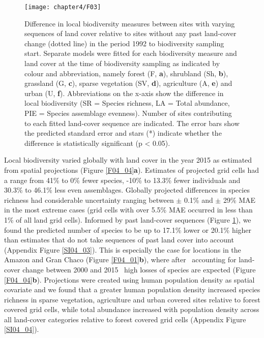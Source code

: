 \begin{figure}[ht]
\centering
\texttt{[image: chapter4/F03]}
\caption{ Difference in local biodiversity measures between sites with varying sequences of land cover relative to sites without any past land-cover change (dotted line) in the period 1992 to biodiversity sampling start. Separate models were fitted for each biodiversity measure and land cover at the time of biodiversity sampling as indicated by colour and abbreviation, namely forest (F, \textbf{a}), shrubland (Sh, \textbf{b}), grassland (G, \textbf{c}), sparse vegetation (SV, \textbf{d}), agriculture (A, \textbf{e}) and urban (U, \textbf{f}). Abbreviations on the x-axis show the difference in local biodiversity (SR = Species richness, LA = Total abundance, PIE = Species assemblage evenness). Number of sites contributing to each fitted land-cover sequence are indicated. The error bars show the predicted standard error and stars (*) indicate whether the difference is statistically significant (p < 0.05).}
\label{F04_03}
\end{figure}

Local biodiversity varied globally with land cover in the year 2015 as estimated from spatial projections (Figure \ref{F04_04}\textbf{a}). Estimates of projected grid cells had a range from 41\% to 0\% fewer species, -10\% to 13.3\% fewer individuals and 30.3\% to 46.1\% less even assemblages. Globally projected differences in species richness had considerable uncertainty ranging between $\pm$ 0.1\% and $\pm$ 29\% MAE in the most extreme cases (grid cells with over 5.5\% MAE occurred in less than 1\% of all land grid cells). Informed by past land-cover sequences (Figure \ref{F04_03}), we found the predicted number of species to be up to 17.1\% lower or 20.1\% higher than estimates that do not take sequences of past land cover into account (Appendix Figure \ref{SI04_03}). This is especially the case for locations in the Amazon and Gran Chaco (Figure \ref{F04_01}\textbf{b}), where after \textendash\ accounting for land-cover change between 2000 and 2015 \textendash\ high losses of species are expected (Figure \ref{F04_04}\textbf{b}). Projections were created using human population density as spatial covariate and we found that a greater human population density increased species richness in sparse vegetation, agriculture and urban covered sites relative to forest covered grid cells, while total abundance increased with population density across all land-cover categories relative to forest covered grid cells (Appendix Figure \ref{SI04_04}).

